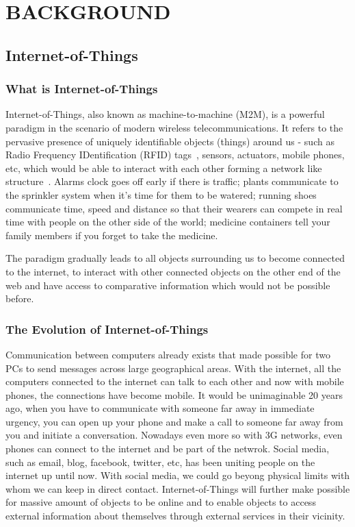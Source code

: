 \cleardoublepage
\singlespacing
\chapter{BACKGROUND}
\label{c:background}
\doublespacing\nointerlineskip

\section{Internet-of-Things}

\subsection{What is Internet-of-Things}

Internet-of-Things, also known as machine-to-machine (M2M), is a powerful
paradigm in the scenario of modern wireless telecommunications. It refers to the
pervasive presence of uniquely identifiable objects (things) around us - such as
Radio Frequency IDentification (RFID) tags~\cite{Shepard2005}, sensors,
      actuators, mobile phones, etc, which would be able to interact with each
      other forming a network like structure~\cite{Atzori20102787}. Alarms clock
      goes off early if there is traffic; plants communicate to the sprinkler
      system when it's time for them to be watered; running shoes communicate
      time, speed and distance so that their wearers can compete in real time
      with people on the other side of the world; medicine containers tell your
      family members if you forget to take the medicine.

The paradigm gradually leads to all objects surrounding us to become connected
to the internet, to interact with other connected objects on the other end of
the web and have access to comparative information which would not be possible
before.

\subsection{The Evolution of Internet-of-Things}

Communication between computers already exists that made possible for two PCs to
send messages across large geographical areas. With the internet, all the
computers connected to the internet can talk to each other and now with mobile
phones, the connections have become mobile.
It would be unimaginable 20 years ago, when you have to communicate with someone
far away in immediate urgency, you can open up your phone and make a call to
someone far away from you and initiate a conversation. Nowadays even more so
with 3G networks, even phones can connect to the internet and be part of the
netwrok.
Social media, such as email, blog, facebook, twitter, etc, has been uniting
people on the internet up until now. With social media, we could go beyong
physical limits with whom we can keep in direct contact. Internet-of-Things will
further make possible for massive amount of objects to be online and to enable
objects to access external information about themselves through external
services in their vicinity.~\cite{Associati2011a}

